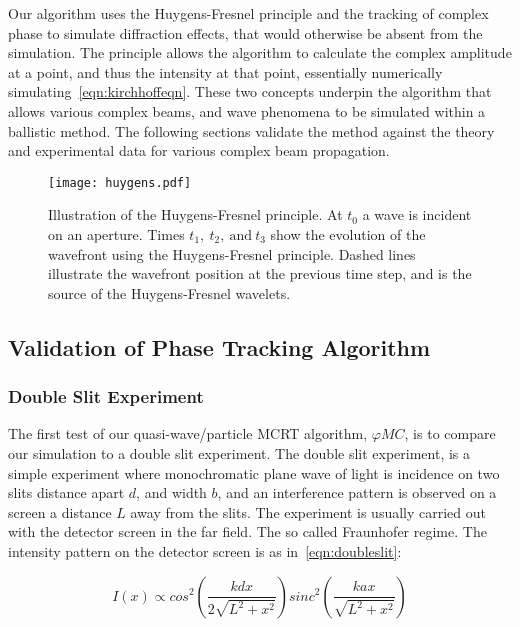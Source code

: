 Our algorithm uses the Huygens-Fresnel principle and the tracking of complex phase to simulate diffraction effects, that would otherwise be absent from the simulation.
The principle allows the algorithm to calculate the complex amplitude at a point, and thus the intensity at that point, essentially numerically simulating~\cref{eqn:kirchhoffeqn}.
These two concepts underpin the algorithm that allows various complex beams, and wave phenomena to be simulated within a ballistic method. The following sections validate the method against the theory and experimental data for various complex beam propagation.

\begin{figure}[!ht]
    \centering
    \texttt{[image: huygens.pdf]}
    \caption{Illustration of the Huygens-Fresnel principle. At $t_0$ a wave is incident on an aperture. Times $t_1,\ t_2,\ \text{and}\ t_3$ show the evolution of the wavefront using the Huygens-Fresnel principle. Dashed lines illustrate the wavefront position at the previous time step, and is the source of the Huygens-Fresnel wavelets.}
    \label{fig:huygensillis}
\end{figure}

\subsection{Validation of Phase Tracking Algorithm}

\subsubsection*{Double Slit Experiment}

The first test of our quasi-wave/particle MCRT algorithm, $\varphi MC$, is to compare our simulation to a double slit experiment.
The double slit experiment, is a simple experiment where monochromatic plane wave of light is incidence on two slits distance apart $d$, and width $b$, and an interference pattern is observed on a screen a distance $L$ away from the slits. The experiment is usually carried out with the detector screen in the far field. The so called Fraunhofer regime.
The intensity pattern on the detector screen is as in~\cref{eqn:doubleslit}:

\begin{equation}
    I(x) \propto cos^2\left(\frac{kdx}{2\sqrt{L^2+x^2}}\right)sinc^2\left(\frac{kax}{\sqrt{L^2+x^2}}\right)
    \label{eqn:doubleslit}
\end{equation}

